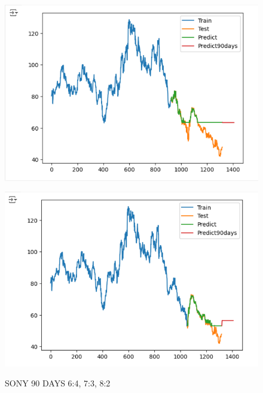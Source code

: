 \documentclass{article}
\begin{document}
\begin{multicols}{2}
\begin{figure}[H]
\begin{minipage}{0.15\textwidth}
    \label{fig:1}
    \end{minipage}%
    \begin{minipage}{0.15\textwidth}
    \centering
    \includegraphics[width=1\textwidth]{Image/GradientBoosting/SONY_90_7_3_GradientBoostingRegressor.png}
  
    \label{fig:2}
    \end{minipage}%
    \begin{minipage}{0.15\textwidth}
    \centering
    \includegraphics[width=1\textwidth]{Image/GradientBoosting/SONY_90_8_2_GradientBoostingRegressor.png}

    \label{fig:3}
    \end{minipage}
    \caption{SONY 90 DAYS  6:4, 7:3, 8:2 }
\end{figure}



\end{multicols}
\end{document}
